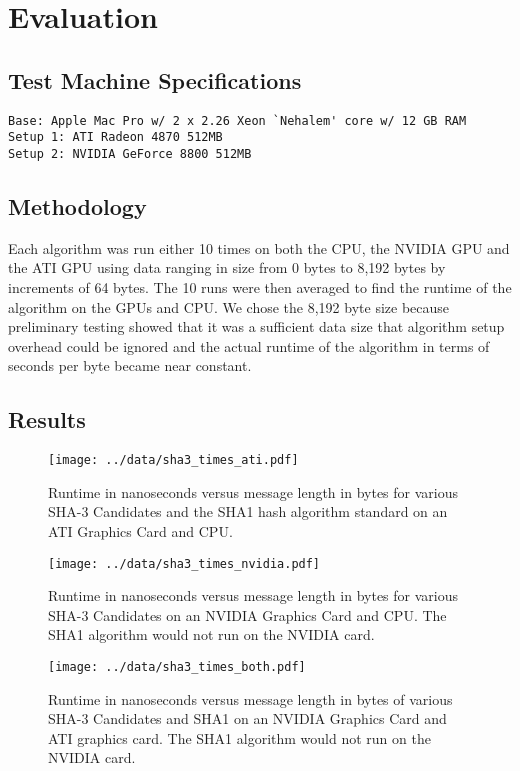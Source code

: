 \section*{Evaluation}

\subsection*{Test Machine Specifications}
\begin{verbatim}
Base: Apple Mac Pro w/ 2 x 2.26 Xeon `Nehalem' core w/ 12 GB RAM
Setup 1: ATI Radeon 4870 512MB
Setup 2: NVIDIA GeForce 8800 512MB
\end{verbatim}

\subsection*{Methodology}
Each algorithm was run either 10 times on both the CPU, the NVIDIA GPU and the ATI GPU using data ranging in size from 0 bytes to 8,192 bytes by increments of 64 bytes.
The 10 runs were then averaged to find the runtime of the algorithm on the GPUs and CPU.
We chose the 8,192 byte size because preliminary testing showed that it was a sufficient data size that algorithm setup overhead could be ignored and the actual runtime of the algorithm in terms of seconds per byte became near constant.

\subsection*{Results}

\begin{figure}[htp]
\texttt{[image: ../data/sha3\_times\_ati.pdf]}
\caption{Runtime in nanoseconds versus message length in bytes for various SHA-3 Candidates and the SHA1 hash algorithm standard on an ATI Graphics Card and CPU.}\label{fig:sha3_times_ati}
\end{figure}

\begin{figure}[htp]
\texttt{[image: ../data/sha3\_times\_nvidia.pdf]}
\caption{Runtime in nanoseconds versus message length in bytes for various SHA-3 Candidates on an NVIDIA Graphics Card and CPU. The SHA1 algorithm would not run on the NVIDIA card.}\label{fig:sha3_times_nvidia}
\end{figure}

\begin{figure}[htp]
\texttt{[image: ../data/sha3\_times\_both.pdf]}
\caption{Runtime in nanoseconds versus message length in bytes of various SHA-3 Candidates and SHA1 on an NVIDIA Graphics Card and ATI graphics card. The SHA1 algorithm would not run on the NVIDIA card.}\label{fig:sha3_times_both}
\end{figure}

